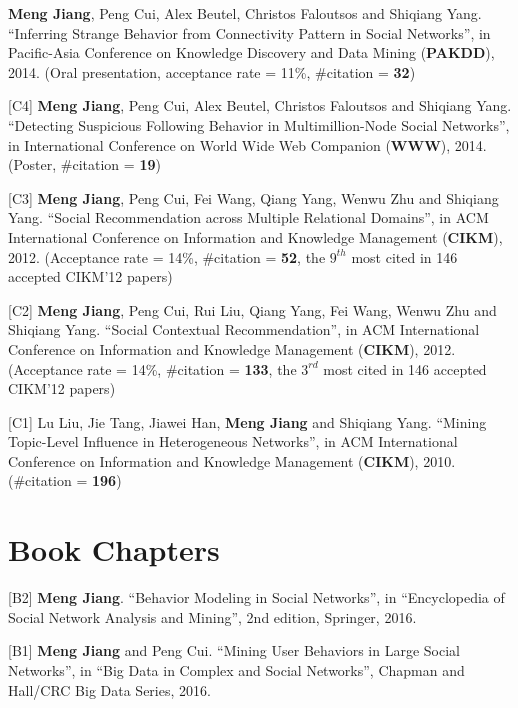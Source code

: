 \documentclass[margin, 10pt]{res}
\begin{document}
\begin{resume}
[C5] \textbf{Meng Jiang}, Peng Cui, Alex Beutel, Christos Faloutsos and Shiqiang Yang. ``Inferring Strange Behavior from Connectivity Pattern in Social Networks'', in Pacific-Asia Conference on Knowledge Discovery and Data Mining (\textbf{PAKDD}), 2014. (Oral presentation, acceptance rate = 11\%, \#citation = \textbf{32})

[C4] \textbf{Meng Jiang}, Peng Cui, Alex Beutel, Christos Faloutsos and Shiqiang Yang. ``Detecting Suspicious Following Behavior in Multimillion-Node Social Networks'', in International Conference on World Wide Web Companion (\textbf{WWW}), 2014. (Poster, \#citation = \textbf{19})

[C3] \textbf{Meng Jiang}, Peng Cui, Fei Wang, Qiang Yang, Wenwu Zhu and Shiqiang Yang. ``Social Recommendation across Multiple Relational Domains'', in ACM International Conference on Information and Knowledge Management (\textbf{CIKM}), 2012. (Acceptance rate = 14\%, \#citation = \textbf{52}, the \textbf{$9^{th}$} most cited in 146 accepted CIKM'12 papers)

[C2] \textbf{Meng Jiang}, Peng Cui, Rui Liu, Qiang Yang, Fei Wang, Wenwu Zhu and Shiqiang Yang. ``Social Contextual Recommendation'', in ACM International Conference on Information and Knowledge Management (\textbf{CIKM}), 2012. (Acceptance rate = 14\%, \#citation = \textbf{133}, the \textbf{$3^{rd}$} most cited in 146 accepted CIKM'12 papers)

[C1] Lu Liu, Jie Tang, Jiawei Han, \textbf{Meng Jiang} and Shiqiang Yang. ``Mining Topic-Level Influence in Heterogeneous Networks'', in ACM International Conference on Information and Knowledge Management (\textbf{CIKM}), 2010. (\#citation = \textbf{196})


\section{Book Chapters}

[B2] \textbf{Meng Jiang}. ``Behavior Modeling in Social Networks'', in ``Encyclopedia of Social Network Analysis and Mining'', 2nd edition, Springer, 2016.

[B1] \textbf{Meng Jiang} and Peng Cui. ``Mining User Behaviors in Large Social Networks'', in ``Big Data in Complex and Social Networks'', Chapman and Hall/CRC Big Data Series, 2016.


\end{resume}
\end{document}
